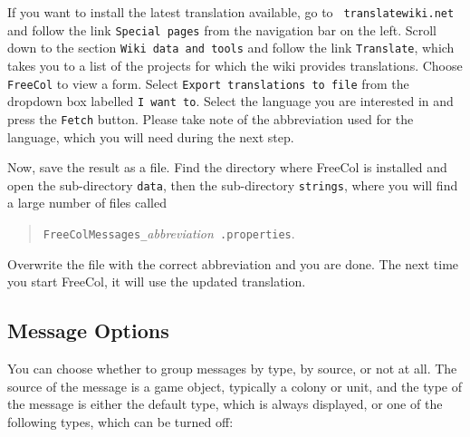 \documentclass[12pt]{book}
\begin{document}
If you want to install the latest translation available, go to {\tt
  trans\-late\-wiki.net} and follow the link {\tt Special pages} from the
navigation bar on the left. Scroll down to the section {\tt Wiki data
  and tools} and follow the link {\tt Translate}, which takes you to a
list of the projects for which the wiki provides translations. Choose
{\tt FreeCol} to view a form. Select {\tt Export translations to file}
from the dropdown box labelled {\tt I want to}. Select the language
you are interested in and press the {\tt Fetch} button. Please take
note of the abbreviation used for the language, which you will need
during the next step.

Now, save the result as a file. Find the directory where FreeCol is
installed and open the sub-directory {\tt data}, then the
sub-directory {\tt strings}, where you will find a large number of
files called

\begin{quotation}
{\tt FreeColMessages\_}{\it abbreviation}{\tt
  .properties}.
\end{quotation}

Overwrite the file with the correct abbreviation and
you are done. The next time you start FreeCol, it will use the updated
translation.




\hypertarget{message options}{\subsection{Message Options}}

You can choose whether to group messages by type, by source, or not at
all. The source of the message is a game object, typically a colony or
unit, and the type of the message is either the default type, which is
always displayed, or one of the following types, which can be turned
off:
\end{document}
